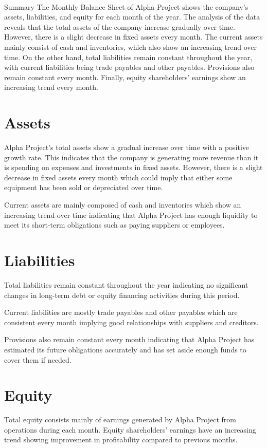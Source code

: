 \nonumsidenote\\{Summary}
The Monthly Balance Sheet of Alpha Project shows the company's assets, liabilities, and equity for each month of the year. The analysis of the data reveals that the total assets of the company increase gradually over time. However, there is a slight decrease in fixed assets every month. The current assets mainly consist of cash and inventories, which also show an increasing trend over time. On the other hand, total liabilities remain constant throughout the year, with current liabilities being trade payables and other payables. Provisions also remain constant every month. Finally, equity shareholders' earnings show an increasing trend every month.

\section{Assets}
Alpha Project's total assets show a gradual increase over time with a positive growth rate. This indicates that the company is generating more revenue than it is spending on expenses and investments in fixed assets. However, there is a slight decrease in fixed assets every month which could imply that either some equipment has been sold or depreciated over time.

Current assets are mainly composed of cash and inventories which show an increasing trend over time indicating that Alpha Project has enough liquidity to meet its short-term obligations such as paying suppliers or employees.

\section{Liabilities}
Total liabilities remain constant throughout the year indicating no significant changes in long-term debt or equity financing activities during this period.

Current liabilities are mostly trade payables and other payables which are consistent every month implying good relationships with suppliers and creditors.

Provisions also remain constant every month indicating that Alpha Project has estimated its future obligations accurately and has set aside enough funds to cover them if needed.

\section{Equity}
Total equity consists mainly of earnings generated by Alpha Project from operations during each month. Equity shareholders' earnings have an increasing trend showing improvement in profitability compared to previous months.

